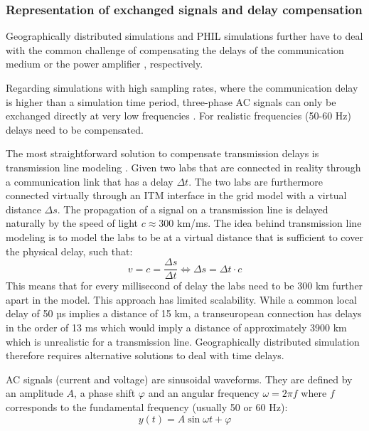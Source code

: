 \documentclass[a4paper]{atseminar}
\begin{document}
\subsubsection{Representation of exchanged signals and delay compensation}
\label{MH:sec:signal-repr}
\label{MH:sec:delay}


Geographically distributed simulations and PHIL simulations further have to deal with the common challenge of compensating the delays of the communication medium or the power amplifier \cite{sansano2015harmonic}, respectively.

Regarding simulations with high sampling rates, where the communication delay is higher than a simulation time period, three-phase AC signals can only be exchanged directly at very low frequencies \cite{ravikumar2009, stevic2017europe}. For realistic frequencies (50-60 Hz) delays need to be compensated.


The most straightforward solution to compensate transmission delays is transmission line modeling \cite{kuffel1995}. Given two labs that are connected in reality through a communication link that has a delay $\Delta t$. The two labs are furthermore connected virtually through an ITM interface in the grid model with a virtual distance $\Delta s$. The propagation of a signal on a transmission line is delayed naturally by the speed of light $c \approx 300$ km/ms. The idea behind transmission line modeling is to model the labs to be at a virtual distance that is sufficient to cover the physical delay, such that:
\begin{equation}
    v = c = \frac{\Delta s}{\Delta t} \iff \Delta s = \Delta t \cdot c
\end{equation}
This means that for every millisecond of delay the labs need to be 300 km further apart in the model. This approach has limited scalability. While a common local delay of 50 µs implies a distance of 15 km, a transeuropean connection has delays in the order of 13 ms \cite{stevic2017europe} which would imply a distance of approximately 3900 km which is unrealistic for a transmission line. Geographically distributed simulation therefore requires alternative solutions to deal with time delays.

AC signals (current and voltage) are sinusoidal waveforms. They are defined by an amplitude $A$, a phase shift $\varphi$ and an angular frequency $\omega = 2\pi f$ where $f$ corresponds to the fundamental frequency (usually 50 or 60 Hz):
\begin{equation}
    y(t) = A \sin{\omega t + \varphi}
\end{equation}
\end{document}
